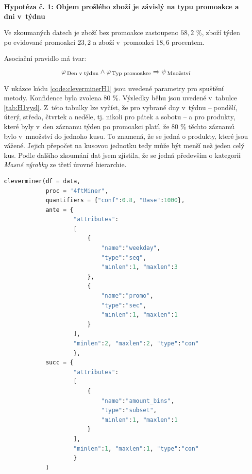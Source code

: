 \textbf{Hypotéza č. 1: Objem prošlého zboží je závislý na typu promoakce a dni v~týdnu}

Ve zkoumaných datech je zboží bez promoakce zastoupeno $58{,}2$ \%, zboží týden po evidované promoakci $23{,}2$ a zboží v~promoakci $18{,}6$ procentem. 

Asociační pravidlo má tvar:
\begin{equation}
    \varphi_{\mbox{\,\footnotesize Den v~týdnu}} \land \varphi_{\,\mbox{\footnotesize Typ promoakce}} \Rightarrow \psi_{\mbox{\,\footnotesize Množství}}
\end{equation}

V ukázce kódu \ref*{code:cleverminerH1} jsou uvedené parametry pro spuštění metody. Konfidence byla zvolena 80 \%. Výsledky běhu jsou uvedené v~tabulce \ref*{tab:H1vysl}. Z~této tabulky lze vyčíst, že pro vybrané dny v~týdnu -- pondělí, úterý, středa, čtvrtek a neděle, tj. nikoli pro pátek a sobotu -- a pro produkty, které byly v~den záznamu týden po promoakci platí, že 80 \% těchto záznamů bylo v~množství do jednoho kusu. To znamená, že se jedná o produkty, které jsou vážené. Jejich přepočet na kusovou jednotku tedy může být menší než jeden celý kus. Podle dalšího zkoumání dat jsem zjistila, že se jedná především o kategorii \emph{Masné výrobky} ze třetí úrovně hierarchie.


\begin{lstlisting}[language=Python, style=mystyle, label={code:cleverminerH1}, caption={Hypotéza č. 1, funkce \texttt{cleverminer}.}]
cleverminer(df = data,
            proc = "4ftMiner", 
            quantifiers = {"conf":0.8, "Base":1000},
            ante = {
                    "attributes":
                    [
                        {
                            "name":"weekday", 
                            "type":"seq", 
                            "minlen":1, "maxlen":3
                        },
                        {
                            "name":"promo", 
                            "type":"sec", 
                            "minlen":1, "maxlen":1
                        }
                    ], 
                    "minlen":2, "maxlen":2, "type":"con"
                    },
            succ = {
                    "attributes":
                    [
                        {
                            "name":"amount_bins", 
                            "type":"subset", 
                            "minlen":1, "maxlen":1
                        }
                    ], 
                    "minlen":1, "maxlen":1, "type":"con"
                    }
            )
    \end{lstlisting}


